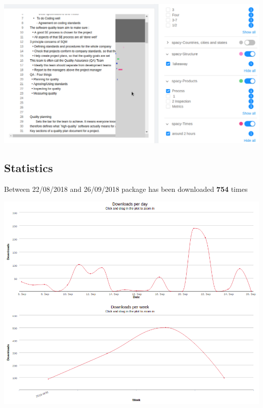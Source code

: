 \documentclass{article}
\begin{document}
\begin{center}
  \includegraphics[scale=0.5]{Screenshot_2018-09-28_11-42-57.png}
\end{center}

\pagebreak

\subsection{Statistics}

\begin{flushleft}
Between 22/08/2018 and 26/09/2018 package has been downloaded \textbf{754} times
\end{flushleft}

\begin{center}
  \includegraphics[scale=0.5]{es-search.png}
\end{center}
\end{document}
